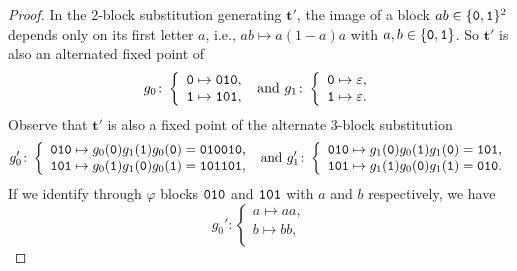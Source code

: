 \documentclass[12pt,reqno]{article}
\newcommand{\cA}{\{{\tt 0},{\tt 1}\}}
\begin{document}
\begin{proof}
  In the $2$-block substitution generating $\mathbf{t}'$, the image of a block $ab\in\cA^2$ depends only on its first letter $a$,  i.e.,  $ab\mapsto a(1-a)a$ with $a,b\in\{{\tt 0},{\tt 1}\}$. So $\mathbf{t}'$ is also an alternated fixed point of
  \begin{equation}
  g_0 \colon \left\{\begin{array}{l}
                      {\tt 0} \mapsto {\tt 010},\\
                      {\tt 1} \mapsto {\tt 101},\\
                    \end{array}\right. \text{ and }
  g_1\colon \left\{\begin{array}{l}
                      {\tt 0} \mapsto \varepsilon,\\
                      {\tt 1} \mapsto \varepsilon.\\
                    \end{array}\right.
                \end{equation}
                Observe that $\mathbf{t}'$ is also a fixed point of the alternate $3$-block substitution
     \begin{equation*}
  g_0' \colon \left\{\begin{array}{l}
                      {\tt 010} \mapsto g_0({\tt 0})g_1({\tt 1})g_0({\tt 0})={\tt 010}{\tt 010},\\
                      {\tt 101}\mapsto g_0({\tt 1})g_1({\tt 0})g_0({\tt 1})={\tt 101}{\tt 101},\\
                    \end{array}\right.\text{ and }
  g_1'\colon \left\{\begin{array}{l}
                      {\tt 010} \mapsto g_1({\tt 0})g_0({\tt 1})g_1({\tt 0})={\tt 101},\\
                      {\tt 101} \mapsto g_1({\tt 1})g_0({\tt 0})g_1({\tt 1})= {\tt 010}.\\
                    \end{array}\right.
                \end{equation*}
                If we identify through $\varphi$ blocks ${\tt 010}$ and ${\tt 101}$ with $a$ and $b$ respectively, we have
        \begin{equation*}
  g_0' \colon \left\{\begin{array}{l}
                      a \mapsto aa, \\
                      b \mapsto bb,\\

\end{array}
\end{equation*}
\end{proof}
\end{document}
